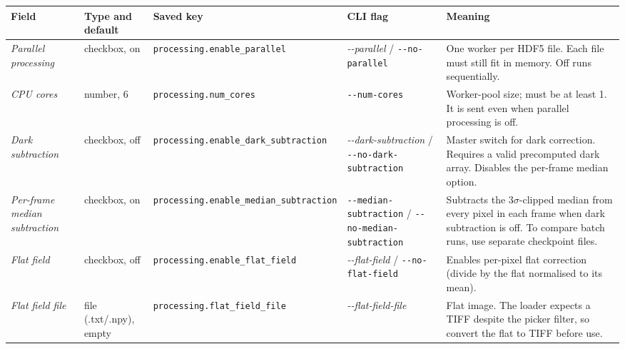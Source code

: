 \documentclass[11pt,a4paper]{article}
\newcommand{\code}[1]{\texttt{#1}}
\begin{document}
\begin{center}
\footnotesize
\begin{longtable}{@{}L{3.4cm}L{2.3cm}L{2.5cm}L{2.8cm}L{4.9cm}@{}}
\toprule
Field & Type and default & Saved key & CLI flag & Meaning \\
\midrule
\endhead
\bottomrule
\endfoot
\emph{Parallel processing} & checkbox, on & \code{processing.\allowbreak{}enable\_\allowbreak{}parallel} &
\emph{-\allowbreak{}-\allowbreak{}parallel} / \code{-\allowbreak{}-\allowbreak{}no-\allowbreak{}parallel} & One worker per HDF5 file. Each
file must still fit in memory. Off runs sequentially. \\
\addlinespace
\emph{CPU cores} & number, 6 & \code{processing.\allowbreak{}num\_\allowbreak{}cores} & \code{-\allowbreak{}-\allowbreak{}num-\allowbreak{}cores} &
Worker-pool size; must be at least 1. It is sent even when parallel
processing is off. \\
\addlinespace
\emph{Dark subtraction} & checkbox, off & \code{processing.\allowbreak{}enable\_\allowbreak{}dark\_\allowbreak{}subtraction} &
\emph{-\allowbreak{}-\allowbreak{}dark-\allowbreak{}subtraction} / \code{-\allowbreak{}-\allowbreak{}no-\allowbreak{}dark-\allowbreak{}subtraction} & Master switch for
dark correction. Requires a valid precomputed dark array. Disables the
per-frame median option. \\
\addlinespace
\emph{Per-frame median subtraction} & checkbox, on &
\code{processing.\allowbreak{}enable\_\allowbreak{}median\_\allowbreak{}subtraction} &
\code{-\allowbreak{}-\allowbreak{}median-\allowbreak{}subtraction} /
\code{-\allowbreak{}-\allowbreak{}no-\allowbreak{}median-\allowbreak{}subtraction} &
Subtracts the 3$\sigma$-clipped median from every pixel in each frame when
dark subtraction is off. To compare batch runs, use separate checkpoint files. \\
\addlinespace
\emph{Flat field} & checkbox, off & \code{processing.\allowbreak{}enable\_\allowbreak{}flat\_\allowbreak{}field} &
\emph{-\allowbreak{}-\allowbreak{}flat-\allowbreak{}field} / \code{-\allowbreak{}-\allowbreak{}no-\allowbreak{}flat-\allowbreak{}field} & Enables per-pixel flat
correction (divide by the flat normalised to its mean). \\
\addlinespace
\emph{Flat field file} & file (.txt/.npy), empty & \code{processing.\allowbreak{}flat\_\allowbreak{}field\_\allowbreak{}file} &
\emph{-\allowbreak{}-\allowbreak{}flat-\allowbreak{}field-\allowbreak{}file} & Flat image. The loader expects a TIFF despite the
picker filter, so convert the flat to TIFF before use. \\

\end{longtable}
\end{center}
\end{document}
